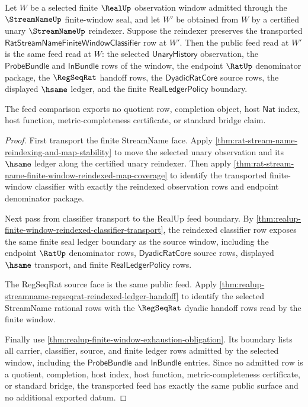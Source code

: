 \begin{theorem}
\label{thm:realup-finite-window-feed-reindexing-stability}
Let $W$ be a selected finite $\RealUp$ observation window admitted through the
$\StreamNameUp$ finite-window seal, and let $W'$ be obtained from $W$ by a
certified unary $\StreamNameUp$ reindexer. Suppose the reindexer preserves the
transported $\mathsf{RatStreamNameFiniteWindowClassifier}$ row at $W'$. Then
the public feed read at $W'$ is the same feed read at $W$: the selected
$\mathsf{UnaryHistory}$ observation, the $\mathsf{ProbeBundle}$ and
$\mathsf{InBundle}$ rows of the window, the endpoint $\RatUp$ denominator package, the
$\RegSeqRat$ handoff rows, the $\mathsf{DyadicRatCore}$ source rows, the
displayed $\hsame$ ledger, and the finite $\mathsf{RealLedgerPolicy}$
boundary.

The feed comparison exports no quotient row, completion object, host
$\mathsf{Nat}$ index, host function, metric-completeness certificate, or
standard bridge claim.
\end{theorem}
\begin{proof}
First transport the finite StreamName face. Apply
\autoref{thm:rat-stream-name-reindexing-and-map-stability} to move the
selected unary observation and its $\hsame$ ledger along the certified unary
reindexer. Then apply
\autoref{thm:rat-stream-name-finite-window-reindexed-map-coverage} to identify
the transported finite-window classifier with exactly the reindexed observation
rows and endpoint denominator package.

Next pass from classifier transport to the RealUp feed boundary. By
\autoref{thm:realup-finite-window-reindexed-classifier-transport}, the
reindexed classifier row exposes the same finite seal ledger boundary as the
source window, including the endpoint $\RatUp$ denominator rows,
$\mathsf{DyadicRatCore}$ source rows, displayed $\hsame$ transport, and finite
$\mathsf{RealLedgerPolicy}$ rows.

The RegSeqRat source face is the same public feed. Apply
\autoref{thm:realup-streamname-regseqrat-reindexed-ledger-handoff} to identify
the selected StreamName rational rows with the $\RegSeqRat$ dyadic handoff
rows read by the finite window.

Finally use \autoref{thm:realup-finite-window-exhaustion-obligation}. Its
boundary lists all carrier, classifier, source, and finite ledger rows admitted
by the selected window, including the $\mathsf{ProbeBundle}$ and $\mathsf{InBundle}$
entries. Since no admitted row is a quotient, completion, host index, host
function, metric-completeness certificate, or standard bridge, the transported
feed has exactly the same public surface and no additional exported datum.
\end{proof}


